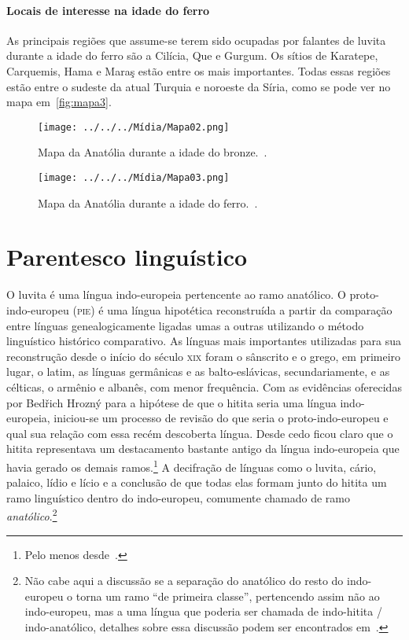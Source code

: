 \paragraph{Locais de interesse na idade do ferro}
As principais regiões que assume-se terem sido ocupadas por falantes de luvita
durante a idade do ferro são a Cilícia, Que e Gurgum.
Os sítios de Karatepe, Carquemis, Hama e Maraş estão entre os mais importantes.
Todas essas regiões estão entre o sudeste da atual Turquia e noroeste da Síria,
como se pode ver no mapa em~\autoref{fig:mapa3}.

\vfill
\clearpage

\begin{figure}[ht!]
	\begin{center}
		\texttt{[image: ../../../Mídia/Mapa02.png]}
	\end{center}
	\caption[Mapa da Anatólia durante a idade do bronze]{Mapa da Anatólia durante
		a idade do bronze.~\citet[37]{Melchert2003}.}\label{fig:mapa2}
	\begin{center}
		\texttt{[image: ../../../Mídia/Mapa03.png]}
	\end{center}
	\caption[Mapa da Anatólia durante a idade do ferro]{Mapa da Anatólia durante
		a idade do ferro.~\citet[94]{Melchert2003}.}\label{fig:mapa3}
\end{figure}

\clearpage

\section{Parentesco linguístico}

O luvita é uma língua indo-europeia pertencente ao ramo anatólico.
O proto-indo-europeu (\textsc{pie}) é uma língua hipotética reconstruída a
partir da comparação entre línguas genealogicamente ligadas umas a outras
utilizando o método linguístico histórico comparativo.
As línguas mais importantes utilizadas para sua reconstrução desde o início do
século \textsc{xix} foram o sânscrito e o grego, em primeiro lugar, o latim, as
línguas germânicas e as balto-eslávicas, secundariamente, e as célticas,
o armênio e albanês, com menor frequência.
Com as evidências oferecidas por Bedřich Hrozný para a hipótese de que o
hitita seria uma língua indo-europeia, iniciou-se um processo de revisão do que
seria o proto-indo-europeu e qual sua relação com essa recém descoberta língua.
Desde cedo ficou claro que o hitita representava um destacamento bastante antigo
da língua indo-europeia que havia gerado os demais ramos.\footnote{Pelo menos
	desde~\citet{Sturtevant1933}.}
A decifração de línguas como o luvita, cário, palaico, lídio e lício e a
conclusão de que todas elas formam junto do hitita um ramo linguístico dentro do
indo-europeu, comumente chamado de ramo \emph{anatólico}.\footnote{Não cabe aqui
	a discussão se a separação do anatólico do resto do indo-europeu o torna um
	ramo ``de primeira classe'', pertencendo assim não ao indo-europeu, mas a uma
	língua que poderia ser chamada de indo-hitita \slash{} indo-anatólico,
	detalhes sobre essa discussão podem ser encontrados em~\citet{Ringue2017}.}

